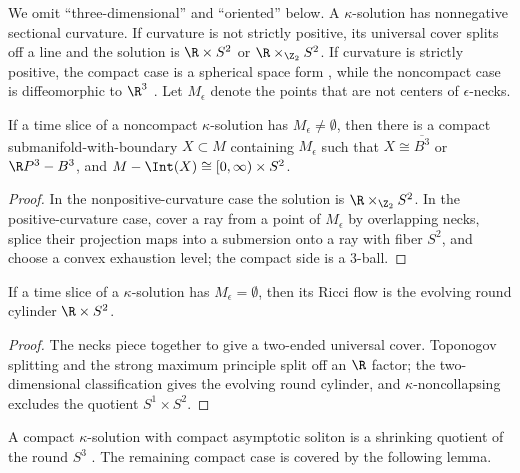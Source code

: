 We omit ``three-dimensional'' and ``oriented'' below. A $\kappa$-solution has
nonnegative sectional curvature. If curvature is not strictly positive, its
universal cover splits off a line and the solution is
$\R\times S^2$ or $\R\times_{\Z_2}S^2$. If curvature is strictly positive,
the compact case is a spherical space form \cite{Hamiltonnnnn}, while the
noncompact case is diffeomorphic to $\R^3$ \cite{Cheeger-Gromoll}. Let
$M_\epsilon$ denote the points that are not centers of $\epsilon$-necks.

\begin{lemma}
  \label{lem:kl-three-dimensional-solutions-existence-kappa-solutions}
 \label{noncompactsoliton}
If a time slice of a noncompact $\kappa$-solution has
$M_\epsilon\ne\emptyset$, then there is a compact submanifold-with-boundary
$X\subset M$ containing $M_\epsilon$ such that
$X\cong\overline{B^3}$ or $\R P^3-B^3$, and
$M-\Int(X)\cong[0,\infty)\times S^2$.
\end{lemma}
\begin{proof}
\sketch In the nonpositive-curvature case the solution is
$\R\times_{\Z_2}S^2$. In the positive-curvature case, cover a ray from a
point of $M_\epsilon$ by overlapping necks, splice their projection maps into
a submersion onto a ray with fiber $S^2$, and choose a convex exhaustion level;
the compact side is a $3$-ball.
\end{proof}

\begin{lemma}
  \label{lem:kl-three-dimensional-solutions-kappa-solutions-lemma}
 \label{onlyneck}
If a time slice of a $\kappa$-solution has $M_\epsilon=\emptyset$, then its
Ricci flow is the evolving round cylinder $\R\times S^2$.
\end{lemma}
\begin{proof}
\sketch The necks piece together to give a two-ended universal cover.
Toponogov splitting and the strong maximum principle split off an $\R$ factor;
the two-dimensional classification gives the evolving round cylinder, and
$\kappa$-noncollapsing excludes the quotient $S^1\times S^2$.
\end{proof}

A compact $\kappa$-solution with compact asymptotic soliton is a shrinking
quotient of the round $S^3$ \cite{Hamiltonnnnn}. The remaining compact case is
covered by the following lemma.

